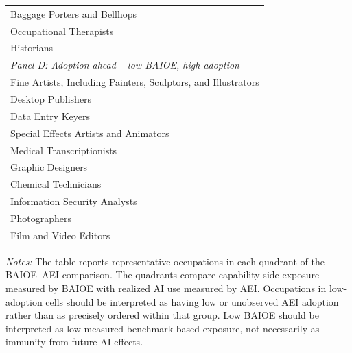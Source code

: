 \begin{table}[htbp]
\begin{tabular}{l}
Baggage Porters and Bellhops \\
Occupational Therapists \\
Historians \\
\textit{Panel D: Adoption ahead -- low BAIOE, high adoption} \\
Fine Artists, Including Painters, Sculptors, and Illustrators \\
Desktop Publishers \\
Data Entry Keyers \\
Special Effects Artists and Animators \\
Medical Transcriptionists \\
Graphic Designers \\
Chemical Technicians \\
Information Security Analysts \\
Photographers \\
Film and Video Editors \\
\bottomrule\end{tabular}
\begin{minipage}{0.95\linewidth}\footnotesize \textit{Notes:} The table reports representative occupations in each quadrant of the BAIOE--AEI comparison. The quadrants compare capability-side exposure measured by BAIOE with realized AI use measured by AEI. Occupations in low-adoption cells should be interpreted as having low or unobserved AEI adoption rather than as precisely ordered within that group. Low BAIOE should be interpreted as low measured benchmark-based exposure, not necessarily as immunity from future AI effects.\end{minipage}
\end{table}
